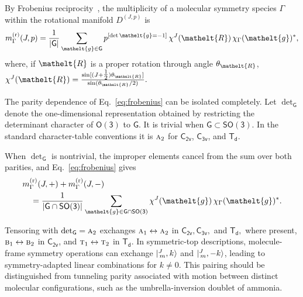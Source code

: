 \documentclass[
  reprint,
  aps,
  prx,
  superscriptaddress,
  amsmath,
  amssymb,
  longbibliography
]{revtex4-2}
\newcommand{\eltfont}[1]{{\let\sigma\eltsigma\mathelt{#1}}}
\newcommand{\grp}[1]{\mathsf{#1}}
\newcommand{\irr}[1]{\text{\normalfont\scshape #1}}
\newcommand{\elt}[1]{\eltfont{#1}}
\newcommand{\iverson}[1]{[#1]}
\newcommand{\irrJp}[2]{D^{(#1,#2)}}
\newcommand{\gel}{\elt{g}}             %
\newcommand{\rotpart}{\elt{R}}         %
\newcommand{\parity}{p}               %
\begin{document}
By Frobenius reciprocity~\cite{Serre1977}, the multiplicity of a molecular symmetry species \(\Gamma\) within the rotational manifold \(\irrJp{J}{\parity}\) is
\begin{equation}
m^{(\mathrm r)}_{\Gamma}(J,\parity)
=
\frac{1}{|\grp{G}|}
\sum_{\gel\in\grp{G}}
\parity^{\iverson{\det\gel=-1}}\,
\chi^{J}(\rotpart)\,
\chi_{\Gamma}(\gel)^{*},
\label{eq:frobenius}
\end{equation}
where, if \(\rotpart\) is a proper rotation through angle \(\theta_{\rotpart}\),
\(
\chi^J(\rotpart)
=
\frac{\sin[(J+\tfrac12)\theta_{\rotpart}]}
     {\sin(\theta_{\rotpart}/2)}.
\)


The parity dependence of Eq.~\eqref{eq:frobenius} can be isolated completely. Let
\(
\det_{\grp{G}}
\)
denote the one-dimensional representation obtained by restricting the determinant character of \(\grp{O(3)}\) to \(\grp{G}\). It is trivial when \(\grp{G}\subset\grp{SO(3)}\). In the standard character-table conventions it is \(\irr{a}_{2}\) for \(\grp{C_{2v}}\), \(\grp{C_{3v}}\), and \(\grp{T_{d}}\).

When \(\det_{\grp{G}}\) is nontrivial, the improper elements cancel from the sum over both parities, and Eq.~\eqref{eq:frobenius} gives
\begin{equation}
\begin{split}
&m^{(\mathrm r)}_{\Gamma}(J,+)
+
m^{(\mathrm r)}_{\Gamma}(J,-)
\\
&\quad=
\frac{1}{|\grp{G}\cap\grp{SO(3)}|}
\sum_{\gel\in\grp{G}\cap\grp{SO(3)}}
\chi^{J}(\gel)\,
\chi_{\Gamma}(\gel)^{*}.
\end{split}
\label{eq:parity_counting}
\end{equation}

Tensoring with \(\det_{\grp{G}}=\irr{a}_{2}\) exchanges \(\irr{a}_{1}\leftrightarrow\irr{a}_{2}\) in $\grp{C_{2v}}, \grp{C_{3v}},$ and $\grp{T_{d}},$ where present, \(\irr{b}_{1}\leftrightarrow\irr{b}_{2}\) in $\grp{C_{2v}}$, and \(\irr{t}_{1}\leftrightarrow\irr{t}_{2}\) in $\grp{T_{d}}.$ In symmetric-top descriptions, molecule-frame symmetry operations can exchange \(\ket{{}^{J}_{\,m},k}\) and \(\ket{{}^{J}_{\,m},-k}\), leading to symmetry-adapted linear combinations for $k\neq0.$ This pairing should be distinguished from tunneling parity associated with motion between distinct molecular configurations, such as the umbrella-inversion doublet of ammonia. 
\end{document}
